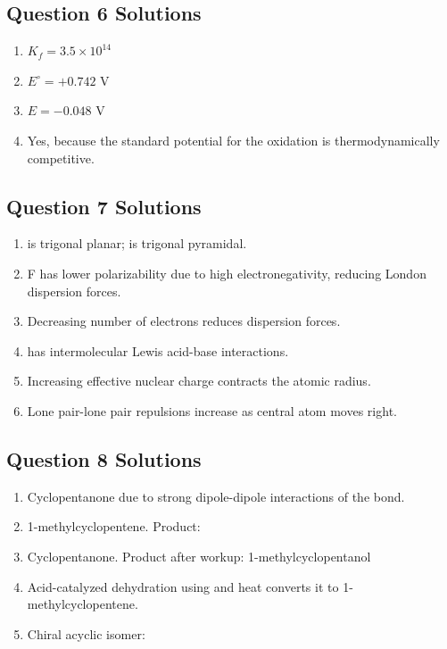 \documentclass{article}
\begin{document}
\subsection*{Question 6 Solutions}
\begin{enumerate}[label=\alph*.]
    \item $K_f = 3.5 \times 10^{14}$
    \item $E^\circ = +0.742\text{ V}$
    \item $E = -0.048\text{ V}$
    \item Yes, because the standard potential for the oxidation is thermodynamically competitive.
\end{enumerate}

\subsection*{Question 7 Solutions}
\begin{enumerate}[label=\alph*.]
    \item {} is trigonal planar;  is trigonal pyramidal.
    \item F has lower polarizability due to high electronegativity, reducing London dispersion forces.
    \item Decreasing number of electrons reduces dispersion forces.
    \item {} has intermolecular Lewis acid-base interactions.
    \item Increasing effective nuclear charge contracts the atomic radius.
    \item Lone pair-lone pair repulsions increase as central atom moves right.
\end{enumerate}

\subsection*{Question 8 Solutions}
\begin{enumerate}[label=\alph*.]
    \item Cyclopentanone due to strong dipole-dipole interactions of the  bond.
    \item 1-methylcyclopentene. Product: \\
    \item Cyclopentanone. Product after workup: 1-methylcyclopentanol \\
    \item Acid-catalyzed dehydration using  and heat converts it to 1-methylcyclopentene.
    \item Chiral acyclic isomer: \\
\end{enumerate}
\end{document}
